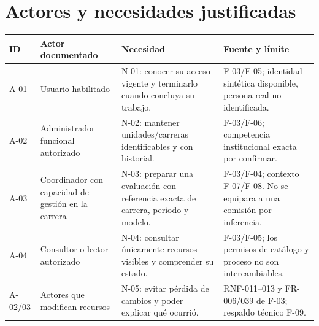 \documentclass[12pt,a4paper]{report}
\begin{document}
\section{Actores y necesidades
justificadas}\label{dossier-actores-y-necesidades-justificadas}

{\def\LTcaptype{none} %
\begin{longtable}[]{@{}
  >{\raggedright\arraybackslash}p{}
  >{\raggedright\arraybackslash}p{}
  >{\raggedright\arraybackslash}p{}
  >{\raggedright\arraybackslash}p{}@{}}
\toprule\noalign{}
\begin{minipage}[b]{\linewidth}\raggedright
ID
\end{minipage} & \begin{minipage}[b]{\linewidth}\raggedright
Actor documentado
\end{minipage} & \begin{minipage}[b]{\linewidth}\raggedright
Necesidad
\end{minipage} & \begin{minipage}[b]{\linewidth}\raggedright
Fuente y límite
\end{minipage} \\
\midrule\noalign{}
\endhead
\bottomrule\noalign{}
\endlastfoot
A-01 & Usuario habilitado & N-01: conocer su acceso vigente y
terminarlo cuando concluya su trabajo. & F-03/F-05; identidad sintética
disponible, persona real no identificada. \\
A-02 & Administrador funcional autorizado & N-02: mantener
unidades/carreras identificables y con historial. & F-03/F-06;
competencia institucional exacta por confirmar. \\
A-03 & Coordinador con capacidad de gestión en la carrera & N-03:
preparar una evaluación con referencia exacta de carrera, período y
modelo. & F-03/F-04; contexto F-07/F-08. No se equipara a una comisión
por inferencia. \\
A-04 & Consultor o lector autorizado & N-04: consultar únicamente
recursos visibles y comprender su estado. & F-03/F-05; los permisos de
catálogo y proceso no son intercambiables. \\
A-02/03 & Actores que modifican recursos & N-05: evitar pérdida de
cambios y poder explicar qué ocurrió. & RNF-011--013 y FR-006/039 de
F-03; respaldo técnico F-09. \\
\end{longtable}
}
\end{document}
